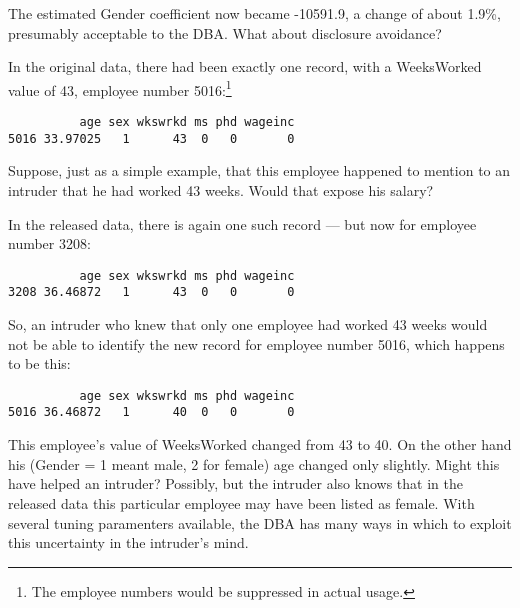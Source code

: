 \documentclass[11pt]{article}
\begin{document}
The estimated Gender coefficient now became -10591.9, a change of about
1.9\%, presumably acceptable to the DBA.  What about disclosure avoidance?

In the original data, there had been exactly one record, with a
WeeksWorked value of 43, employee number 5016:\footnote{The
employee numbers would be suppressed in actual usage.}

\begin{lstlisting}
          age sex wkswrkd ms phd wageinc
5016 33.97025   1      43  0   0       0
\end{lstlisting}

Suppose, just as a simple example, that this employee happened to
mention to an intruder that he had worked 43 weeks.  Would that expose
his salary?

In the released data, there is again one such record --- but now for
employee number 3208:

\begin{lstlisting}
          age sex wkswrkd ms phd wageinc
3208 36.46872   1      43  0   0       0
\end{lstlisting}

So, an intruder who knew that only one employee had worked 43 weeks 
would not be able to identify the new record for employee number 5016,
which happens to be this:

\begin{lstlisting}
          age sex wkswrkd ms phd wageinc
5016 36.46872   1      40  0   0       0
\end{lstlisting}

This employee's value of WeeksWorked changed from 43 to 40.  On the
other hand his (Gender = 1 meant male, 2 for female) age changed only
slightly.  Might this have helped an intruder?  Possibly, but the
intruder also knows that in the released data this particular employee
may have been listed as female.  With several tuning paramenters
available, the DBA has many ways in which to exploit this uncertainty in
the intruder's mind.


\end{document}

